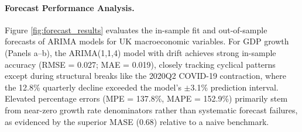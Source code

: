 \documentclass[
]{article}
\begin{document}
\paragraph*{Forecast Performance Analysis.}  Figure \ref{fig:forecast_results} 
evaluates the in-sample fit and out-of-sample forecasts of ARIMA models for
UK macroeconomic variables. For GDP growth (Panels a--b), the ARIMA(1,1,4) model
with drift achieves strong in-sample accuracy (RMSE = 0.027; MAE = 0.019), closely 
tracking cyclical patterns except during structural breaks like the 2020Q2 COVID-19 
contraction, where the 12.8\% quarterly decline exceeded the 
model's $\pm$3.1\% prediction interval. Elevated percentage errors
(MPE = 137.8\%, MAPE = 152.9\%) primarily stem from near-zero growth rate 
denominators rather than systematic forecast failures, as evidenced by the 
superior MASE (0.68) relative to a naive benchmark.  
\end{document}
